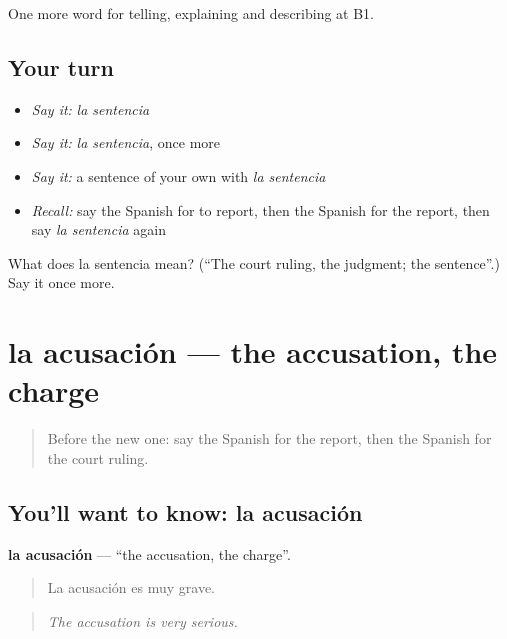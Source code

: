 \begin{grammarlens}[title={What you've built}]
One more word for telling, explaining and describing at B1.
\end{grammarlens}

\subsection*{Your turn}
\begin{itemize}
\raggedright
  \item \emph{Say it:} \emph{la sentencia}
  \item \emph{Say it:} \emph{la sentencia}, once more
  \item \emph{Say it:} a sentence of your own with \emph{la sentencia}
  \item \emph{Recall:} say the Spanish for to report, then the Spanish for the report, then say \emph{la sentencia} again
\end{itemize}

\begin{tcolorbox}[breakable,colback=teal!4,colframe=teal!35!black,title={Before you move on}]
What does la sentencia mean? (\textquotedblleft{}The court ruling, the judgment; the sentence\textquotedblright{}.) Say it once more.
\end{tcolorbox}
\section[la acusación]{la acusación — the accusation, the charge}

\label{lesson:ES-C626-acusacion}



\begin{quote}
Before the new one: say the Spanish for the report, then the Spanish for the court ruling.
\end{quote}

\subsection*{You'll want to know: la acusación}
\textbf{la acusación} — \textquotedblleft{}the accusation, the charge\textquotedblright{}.

\begin{quote}
La acusación es muy grave.
\end{quote}

\begin{quote}
\emph{The accusation is very serious.}
\end{quote}

